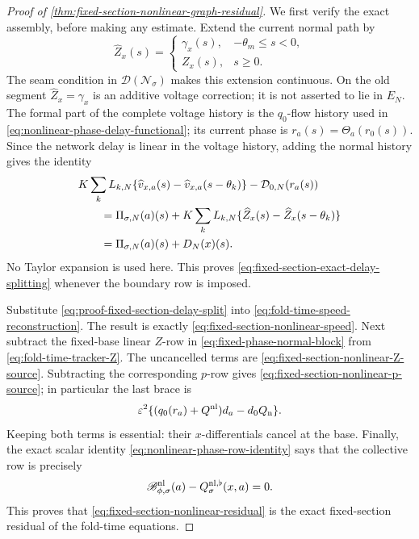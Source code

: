 \begin{proof}[Proof of
\cref{thm:fixed-section-nonlinear-graph-residual}]
We first verify the exact assembly, before making any estimate.  Extend the
current normal path by
\[
 \widehat Z_x(s)=
 \begin{cases}
  \gamma_x(s),&-\theta_m\le s<0,\\
  Z_x(s),&s\ge0.
 \end{cases}
\]
The seam condition in \(\mathcal D(\mathscr N_\sigma)\) makes this
extension continuous.  On the old segment \(\widehat Z_x=\gamma_x\) is
an additive voltage correction; it is not asserted to lie in \(E_N\).
The formal part of the complete voltage history is
the \(q_0\)-flow history used in
\cref{eq:nonlinear-phase-delay-functional}; its current phase is
\(r_a(s)=\Theta_a(r_0(s))\).  Since the network delay is linear in the
voltage history, adding the normal history gives the identity
\begin{align}
 &K\sum_kL_{k,N}
    \{\widehat v_{x,a}(s)-\widehat v_{x,a}(s-\theta_k)\}
          -\mathcal D_{0,N}(r_a(s))\notag\\
 &\qquad=\Pi_{\sigma,N}(a)(s)
  +K\sum_kL_{k,N}
       \{\widehat Z_x(s)-\widehat Z_x(s-\theta_k)\}\notag\\
 &\qquad=\Pi_{\sigma,N}(a)(s)+D_N(x)(s).          \label{eq:proof-fixed-section-delay-split}
\end{align}
No Taylor expansion is used here.  This proves
\cref{eq:fixed-section-exact-delay-splitting} whenever the boundary row is
imposed.

Substitute \cref{eq:proof-fixed-section-delay-split} into
\cref{eq:fold-time-speed-reconstruction}.  The result is exactly
\cref{eq:fixed-section-nonlinear-speed}.  Next subtract the fixed-base
linear \(Z\)-row in \cref{eq:fixed-phase-normal-block} from
\cref{eq:fold-time-tracker-Z}.  The uncancelled terms are
\cref{eq:fixed-section-nonlinear-Z-source}.  Subtracting the corresponding
\(p\)-row gives
\cref{eq:fixed-section-nonlinear-p-source}; in particular the last brace is
\[
 \varepsilon^2\{(q_0(r_a)+Q^{\rm nl})d_a-d_0Q_{\rm n}\}.
\]
Keeping both terms is essential: their \(x\)-differentials cancel at the
base.  Finally, the exact scalar identity
\cref{eq:nonlinear-phase-row-identity} says that the collective
row is precisely
\[
 \mathscr B_{\phi,\sigma}^{\rm nl}(a)
             -Q_\sigma^{\rm nl,\flat}(x,a)=0.
\]
This proves that \cref{eq:fixed-section-nonlinear-residual} is the exact
fixed-section residual of the fold-time equations.


\end{proof}
